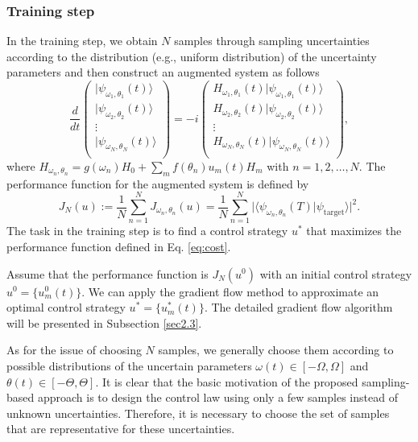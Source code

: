 \documentclass[letterpaper, 10 pt, conference]{ieeeconf}
\begin{document}
\subsubsection{Training step}\label{sec:training}
In the training step, we obtain $N$ samples through sampling uncertainties according to the distribution (e.g., uniform
distribution) of the uncertainty parameters and then construct an
augmented system as follows
\begin{equation}\label{augmented-system}
\frac{d}{dt}\left(\begin{array}{c}
  |{\psi}_{\omega_1,\theta_1}(t)\rangle \\
  |{\psi}_{\omega_2,\theta_2}(t)\rangle \\
  \vdots \\
  |{\psi}_{\omega_N,\theta_N}(t)\rangle \\
\end{array}\right)
=-i\left(\begin{array}{c}
  H_{\omega_1,\theta_1}(t)|\psi_{\omega_1,\theta_1}(t)\rangle \\
  H_{\omega_2,\theta_2}(t)|\psi_{\omega_2,\theta_2}(t)\rangle \\
  \vdots \\
  H_{\omega_N,\theta_N}(t)|\psi_{\omega_N,\theta_N}(t)\rangle \\
\end{array}\right),
\end{equation}
where
$H_{\omega_n,\theta_n}=g(\omega_{n})H_{0}+\sum_{m}f(\theta_{n})u_{m}(t)H_{m}$
with $n=1,2,\dots,N$. The performance function for the augmented
system is defined by
\begin{equation}\label{eq:cost}
J_N(u):=\frac{1}{N}\sum_{n=1}^N J_{\omega_n,\theta_n}(u)=\frac{1}{N}\sum_{n=1}^{N}\vert \langle\psi_{\omega_n,\theta_n}(T)|\psi_{\text{target}}\rangle\vert^{2}.
\end{equation} The task in the training step is to find a control
strategy $u^*$
that maximizes the performance function defined in Eq.
\eqref{eq:cost}.


Assume that the performance function is $J_N(u^{0})$ with an initial
control strategy $u^{0}=\{u^{0}_{m}(t)\}$. We can apply the
gradient flow method to approximate an optimal control strategy
$u^{*}=\{u^{*}_{m}(t)\}$. The detailed gradient flow algorithm
will be presented in Subsection \ref{sec2.3}.

As for the issue of choosing $N$ samples,
we generally choose them according to possible distributions of the
uncertain parameters $\omega(t) \in [-\Omega,\Omega]$ and
$\theta(t) \in [-\Theta, \Theta]$. It is clear that the basic
motivation of the proposed sampling-based approach is to design the
control law using only a few samples instead of unknown uncertainties. Therefore, it is
necessary to choose the set of samples that are representative for
these uncertainties.
\end{document}

